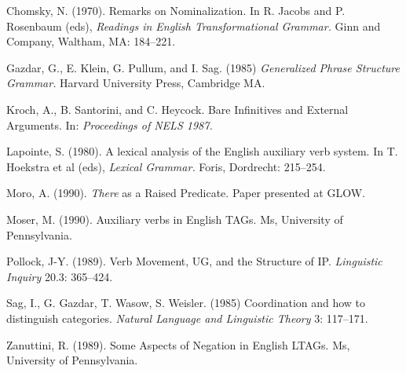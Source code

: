 \begin{thebibliography}{Gazdar et al al 85}

 Chomsky, N. (1970). Remarks on
Nominalization.  In R. Jacobs and P. Rosenbaum (eds), {\em Readings in
English Transformational Grammar.\/} Ginn and Company, Waltham, MA:
184--221. 

 Gazdar, G., E. Klein, G. Pullum, and 
I. Sag.  (1985) {\em Generalized Phrase Structure Grammar.} Harvard
University Press, Cambridge MA.

Kroch, A., B. Santorini, and C. Heycock.  Bare
Infinitives and External Arguments.  In: {\em Proceedings of NELS
1987.\/}

 Lapointe, S. (1980). A lexical analysis of
the English auxiliary verb system. In T. Hoekstra et al (eds), {\em
Lexical Grammar.\/} Foris, Dordrecht: 215--254. 

 Moro, A. (1990). {\em There} as a Raised
Predicate. Paper presented at GLOW.

 Moser, M. (1990). Auxiliary verbs in English
TAGs. Ms, University of Pennsylvania.

 Pollock, J-Y. (1989). Verb Movement, UG, and
the Structure of IP. {\em Linguistic Inquiry\/} 20.3: 365--424.

 Sag, I., G. Gazdar, T. Wasow, S. Weisler.
(1985) Coordination and how to distinguish categories. {\em Natural
Language and Linguistic Theory\/} 3: 117--171.

 Zanuttini, R. (1989). Some Aspects of
Negation in English LTAGs. Ms, University of Pennsylvania.

\end{thebibliography}


